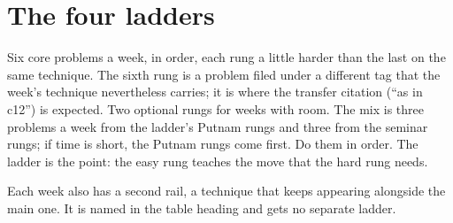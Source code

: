 \section{The four ladders}
\label{sec:ladders}

Six core problems a week, in order, each rung a little harder than the last on the same technique. The sixth rung is a problem filed under a different tag that the week's technique nevertheless carries; it is where the transfer citation (``as in c12'') is expected. Two optional rungs for weeks with room. The mix is three problems a week from the ladder's Putnam rungs and three from the seminar rungs; if time is short, the Putnam rungs come first. Do them in order. The ladder is the point: the easy rung teaches the move that the hard rung needs.

Each week also has a second rail, a technique that keeps appearing alongside the main one. It is named in the table heading and gets no separate ladder.
